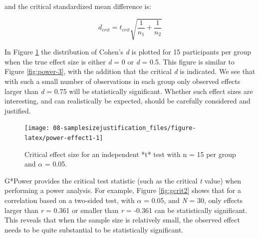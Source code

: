 \documentclass[
]{krantz}
\begin{document}
and the critical standardized mean difference is:

\[d_{crit} = t_{crit}{\sqrt{\frac{1}{n_1} + \frac{1}{n_2}}}\]

In Figure \ref{fig:power-effect1} the distribution of Cohen's \emph{d} is plotted for 15 participants per group when the true effect size is either \emph{d} = 0 or \emph{d} = 0.5. This figure is similar to Figure \ref{fig:power-3}, with the addition that the critical \emph{d} is indicated. We see that with such a small number of observations in each group only observed effects larger than \emph{d} = 0.75 will be statistically significant. Whether such effect sizes are interesting, and can realistically be expected, should be carefully considered and justified.

\begin{figure}

{\centering \texttt{[image: 08-samplesizejustification\_files/figure-latex/power-effect1-1]} 

}

\caption{Critical effect size for an independent *t* test with n = 15 per group and $\alpha$ = 0.05.}\label{fig:power-effect1}
\end{figure}

G*Power provides the critical test statistic (such as the critical \emph{t} value) when performing a power analysis. For example, Figure \ref{fig:gcrit2} shows that for a correlation based on a two-sided test, with \(\alpha\) = 0.05, and \emph{N} = 30, only effects larger than \emph{r} = 0.361 or smaller than \emph{r} = -0.361 can be statistically significant. This reveals that when the sample size is relatively small, the observed effect needs to be quite substantial to be statistically significant.
\end{document}
